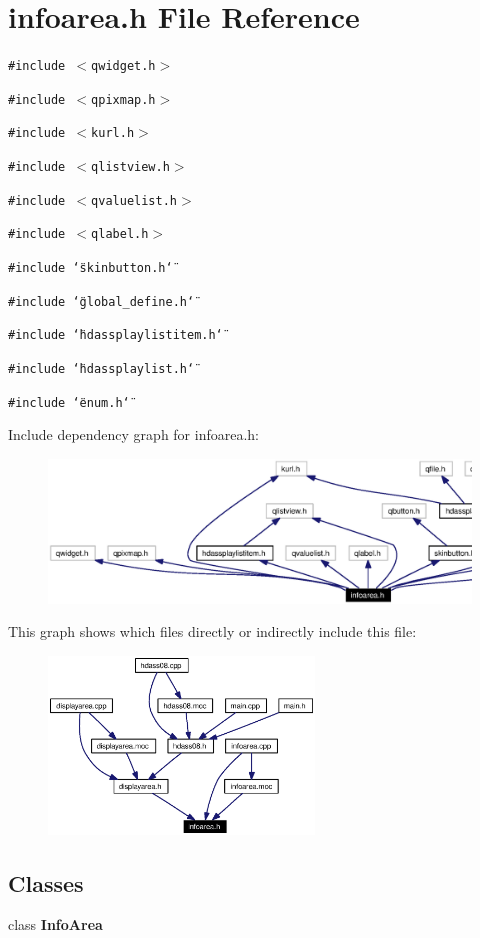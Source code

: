 \section{infoarea.h File Reference}
\label{infoarea_8h}


{\tt \#include $<$qwidget.h$>$}\par
{\tt \#include $<$qpixmap.h$>$}\par
{\tt \#include $<$kurl.h$>$}\par
{\tt \#include $<$qlistview.h$>$}\par
{\tt \#include $<$qvaluelist.h$>$}\par
{\tt \#include $<$qlabel.h$>$}\par
{\tt \#include \char`\"{}skinbutton.h\char`\"{}}\par
{\tt \#include \char`\"{}global\_\-define.h\char`\"{}}\par
{\tt \#include \char`\"{}hdassplaylistitem.h\char`\"{}}\par
{\tt \#include \char`\"{}hdassplaylist.h\char`\"{}}\par
{\tt \#include \char`\"{}enum.h\char`\"{}}\par


Include dependency graph for infoarea.h:\begin{figure}[H]
\begin{center}
\leavevmode
\includegraphics[width=399pt]{infoarea_8h__incl}
\end{center}
\end{figure}


This graph shows which files directly or indirectly include this file:\begin{figure}[H]
\begin{center}
\leavevmode
\includegraphics[width=200pt]{infoarea_8h__dep__incl}
\end{center}
\end{figure}
\subsection*{Classes}
\begin{CompactItemize}
\item 
class {\bf Info\-Area}
\end{CompactItemize}
